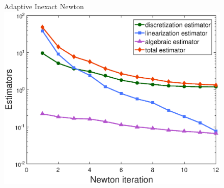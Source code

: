 \documentclass[10 pt]{beamer}
\begin{document}
\begin{frame}
\begin{figure}
  \begin{minipage}[c]{.32\linewidth}
  \centering
  Adaptive Inexact Newton  
   \includegraphics[width=\textwidth]{fig_article/estimators_newton_step_adapt_inexact_resolution_modif_2.eps}     
\end{minipage}\hfill
\end{figure}
\end{frame}


%
\end{document}
